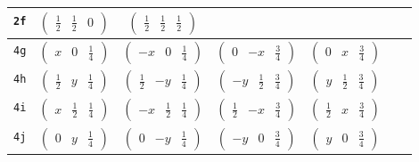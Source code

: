 \documentclass[fleqn,9pt,landscape]{jsarticle}
\begin{document}
\begin{center}
\begin{longtable}{ccccccc}
{\tt 2f} & $ \begin{pmatrix} \frac{1}{2} & \frac{1}{2} & 0 \end{pmatrix} $ & $ \begin{pmatrix} \frac{1}{2} & \frac{1}{2} & \frac{1}{2} \end{pmatrix} $ & $  $ & $  $ & $  $ & $  $ \\ \hline
{\tt 4g} & $ \begin{pmatrix} x & 0 & \frac{1}{4} \end{pmatrix} $ & $ \begin{pmatrix} - x & 0 & \frac{1}{4} \end{pmatrix} $ & $ \begin{pmatrix} 0 & - x & \frac{3}{4} \end{pmatrix} $ & $ \begin{pmatrix} 0 & x & \frac{3}{4} \end{pmatrix} $ & $  $ & $  $ \\ \hline
{\tt 4h} & $ \begin{pmatrix} \frac{1}{2} & y & \frac{1}{4} \end{pmatrix} $ & $ \begin{pmatrix} \frac{1}{2} & - y & \frac{1}{4} \end{pmatrix} $ & $ \begin{pmatrix} - y & \frac{1}{2} & \frac{3}{4} \end{pmatrix} $ & $ \begin{pmatrix} y & \frac{1}{2} & \frac{3}{4} \end{pmatrix} $ & $  $ & $  $ \\ \hline
{\tt 4i} & $ \begin{pmatrix} x & \frac{1}{2} & \frac{1}{4} \end{pmatrix} $ & $ \begin{pmatrix} - x & \frac{1}{2} & \frac{1}{4} \end{pmatrix} $ & $ \begin{pmatrix} \frac{1}{2} & - x & \frac{3}{4} \end{pmatrix} $ & $ \begin{pmatrix} \frac{1}{2} & x & \frac{3}{4} \end{pmatrix} $ & $  $ & $  $ \\ \hline
{\tt 4j} & $ \begin{pmatrix} 0 & y & \frac{1}{4} \end{pmatrix} $ & $ \begin{pmatrix} 0 & - y & \frac{1}{4} \end{pmatrix} $ & $ \begin{pmatrix} - y & 0 & \frac{3}{4} \end{pmatrix} $ & $ \begin{pmatrix} y & 0 & \frac{3}{4} \end{pmatrix} $ & $  $ & $  $ \\ \hline

\end{longtable}
\end{center}
\end{document}
